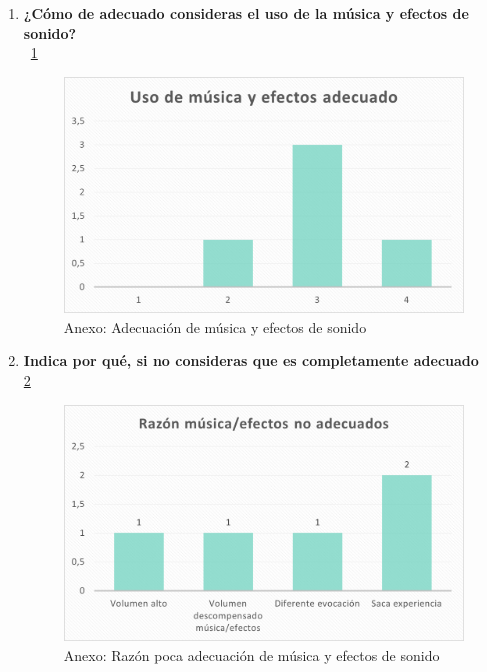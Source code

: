 \documentclass[12pt, a4paper,twoside,titlepage]{book}
\begin{document}
\begin{enumerate}[label=\textbf{\arabic*}.]
	 \item \textbf{¿Cómo de adecuado consideras el uso de la música y efectos de sonido?}\\
	~\ref{fig:anexMusic}
	 	 \begin{figure}
	 	\centering
	 	\includegraphics[width=.8\linewidth]{Anexo Demo/3AnexDem_musi}
	 	\caption{Anexo: Adecuación de música y efectos de sonido}
	 	\label{fig:anexMusic}
	 	\end{figure}
	 \item \textbf{ Indica por qué, si no consideras que es completamente adecuado}\\
	 	\ref{fig:anexRazonmusic}
	 	 \begin{figure}
	 	\centering
	 	\includegraphics[width=.8\linewidth]{Anexo Demo/4AnexDemo_razonmusi}
	 	\caption{Anexo: Razón poca adecuación de música y efectos de sonido}
	 	\label{fig:anexRazonmusic}
	 \end{figure}
	 

\end{enumerate}
\end{document}
